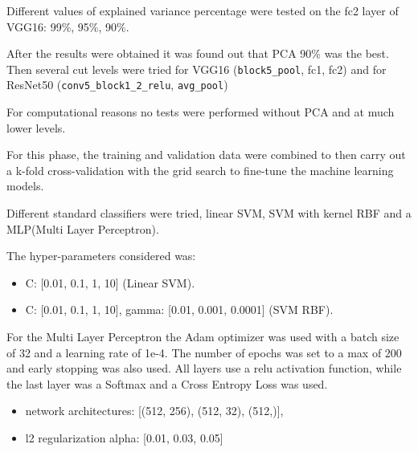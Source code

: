 \noindent
Different values of explained variance percentage were tested on the fc2 layer of VGG16: 99\%, 95\%, 90\%.

\noindent
After the results were obtained it was found out that PCA 90\% was the best. 
Then several cut levels were tried for VGG16 (\texttt{block5\_pool}, fc1, fc2) and for ResNet50 (\texttt{conv5\_block1\_2\_relu}, \texttt{avg\_pool})

\noindent
For computational reasons no tests were performed without PCA and at much lower levels.

\vspace{5mm}
\noindent
For this phase, the training and validation data were combined to then carry out a k-fold cross-validation with the grid search to fine-tune the machine learning models.

\noindent
Different standard classifiers were tried, linear SVM, SVM with kernel RBF and a MLP(Multi Layer Perceptron).

\noindent
The hyper-parameters considered was:
\begin{itemize}
    \item C: [0.01, 0.1, 1, 10] (Linear SVM).
    \item C: [0.01, 0.1, 1, 10], gamma: [0.01, 0.001, 0.0001] (SVM RBF).
\end{itemize}

\noindent
For the Multi Layer Perceptron the Adam optimizer was used with a batch size of 32 and a learning rate of 1e-4. The number of epochs was set to a max of 200 and early stopping was also used. 
All layers use a relu activation function, while the last layer was a Softmax and a Cross Entropy Loss was used.
\begin{itemize}
    \item network architectures: [(512, 256), (512, 32), (512,)],
    \item l2 regularization alpha: [0.01, 0.03, 0.05]
\end{itemize}
